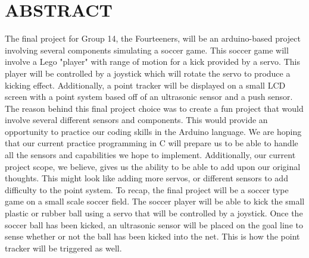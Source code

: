 \documentclass[12pt]{article}
\begin{document}
\tableofcontents
\pagebreak

\section{ABSTRACT}
The final project for Group 14, the Fourteeners, will be an arduino-based project involving several components simulating a soccer game. This soccer game will involve a Lego "player" with range of motion for a kick provided by a servo. This player will be controlled by a joystick which will rotate the servo to produce a kicking effect. Additionally, a point tracker will be displayed on a small LCD screen with a point system based off of an ultrasonic sensor and a push sensor.
The reason behind this final project choice was to create a fun project that would involve several different sensors and components. This would provide an opportunity to practice our coding skills in the Arduino language. We are hoping that our current practice programming in C will prepare us to be able to handle all the sensors and capabilities we hope to implement. Additionally, our current project scope, we believe, gives us the ability to be able to add upon our original thoughts. This might look like adding more servos, or different sensors to add difficulty to the point system.
To recap, the final project will be a soccer type game on a small scale soccer field. The soccer player will be able to kick the small plastic or rubber ball using a servo that will be controlled by a joystick. Once the soccer ball has been kicked, an ultrasonic sensor will be placed on the goal line to sense whether or not the ball has been kicked into the net. This is how the point tracker will be triggered as well.
\end{document}
